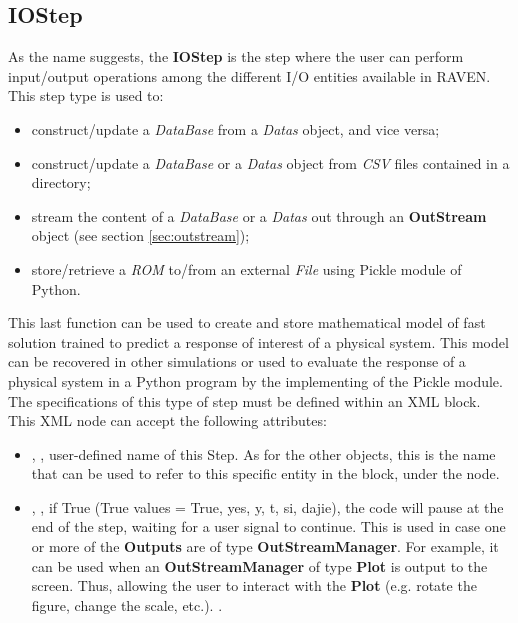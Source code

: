 \subsection{IOStep}
\label{subsec:stepIOStep}
As the name suggests, the \textbf{IOStep} is the step where the user can perform
input/output operations among the different I/O entities available in RAVEN.
%
This step type is used to: 
\begin{itemize}
 \item construct/update a \textit{DataBase} from a \textit{Datas} object, and
   vice versa;
 \item construct/update a \textit{DataBase} or a \textit{Datas} object from
   \textit{CSV} files contained in a directory;
 \item stream the content of a \textit{DataBase} or a \textit{Datas} out through
   an \textbf{OutStream} object (see section \ref{sec:outstream});
\item store/retrieve a \textit{ROM} to/from an external \textit{File} using Pickle module
 of Python.
\end{itemize}
This last function can be used to create and store mathematical model of fast solution
 trained to predict a response of interest of a physical system. This model can be 
recovered in other simulations or used to evaluate the response of a physical system
 in a Python program by the implementing of the Pickle module. 
%
The specifications of this type of step must be defined within an
 XML block.
%
This XML node can accept the following attributes:
\vspace{-5mm}
\begin{itemize}
\itemsep0em
\item {}, , user-defined name of
  this Step.
  \nb As for the other objects, this is the name that can be used to refer to
    this specific entity in the  block, under the 
     node.
\item {}, , if True
  (True values = True, yes, y, t, si, dajie), the code will pause at the end of
  the step, waiting for a user signal to continue. This is used in case one or
  more of the \textbf{Outputs} are of type \textbf{OutStreamManager}.
  For example, it can be used when an \textbf{OutStreamManager} of type
  \textbf{Plot} is output to the screen. Thus, allowing the user to interact
  with the \textbf{Plot} (e.g. rotate the figure, change the scale, etc.).
.
\end{itemize}
